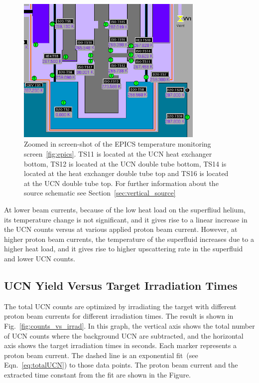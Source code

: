 \begin{figure}[h!]
  \centering
  \includegraphics[width=0.8\textwidth]{TSs.png}
  \caption[TUCAN's EPICS temperature monitoring screen~(zoomed
  in)]{Zoomed in screen-shot of the EPICS temperature monitoring
    screen~\ref{fig:epics}. TS11 is located at the UCN heat exchanger
    bottom, TS12 is located at the UCN double tube bottom, TS14 is
    located at the heat exchanger double tube top and TS16 is located
    at the UCN double tube top. For further information about the
    source schematic see Section~\ref{sec:vertical_source}}
  \label{fig:TSs}
\end{figure}

At lower beam currents, because of the low heat load on the superfliud
helium, its temperature change is not significant, and it gives rise
to a linear increase in the UCN counts versus at various applied
proton beam current. However, at higher proton beam currents, the
temperature of the superfluid increases due to a higher heat load, and
it gives rise to higher upscattering rate in the superfluid and lower
UCN counts.


\subsection{UCN Yield Versus Target Irradiation Times}
The total UCN counts are optimized by irradiating the target with
different proton beam currents for different irradiation times. The
result is shown in Fig.~\ref{fig:counts_vs_irrad}. In this graph, the
vertical axis shows the total number of UCN counts where the
background UCN are subtracted, and the horizontal axis shows the
target irradiation times in seconds. Each marker represents a proton
beam current. The dashed line is an exponential fit~(see
Eqn.~\ref{eq:totalUCN}) to those data points. The proton beam current
and the extracted time constant from the fit are shown in the Figure.

